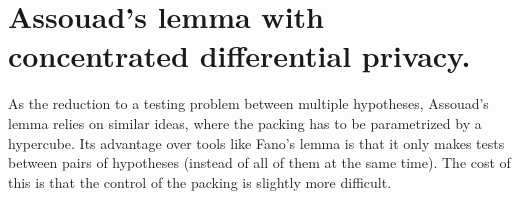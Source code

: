\documentclass[10pt]{article} %
\newcommand{\V}[0]{\mathbb{V}}
\newcommand\p[1]{\left( {#1}\right)}
\newcommand\RG[1]{\textcolor{red}{#1}}
\begin{document}

\section{Assouad's lemma with concentrated differential privacy.}
\label{assouadcdp}

As the reduction to a testing problem between multiple hypotheses, Assouad's lemma relies on similar ideas, where the packing has to be parametrized by a hypercube. Its advantage over tools like Fano's lemma is that it only makes tests between pairs of hypotheses (instead of all of them at the same time). The cost of this is that the control of the packing is slightly more difficult.
\end{document}
